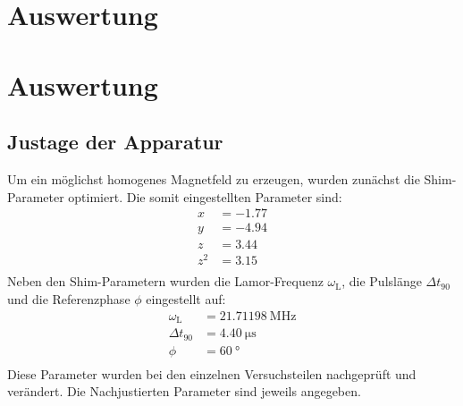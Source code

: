 \section{Auswertung}
\label{sec:Auswertung}

\newpage
\section{Auswertung}
\label{sec:Auswertung}

\subsection{Justage der Apparatur}
Um ein möglichst homogenes Magnetfeld zu erzeugen, wurden zunächst die
Shim-Parameter optimiert. Die somit eingestellten Parameter sind:
\begin{align*}
  x &= \num{-1.77}  \\
  y &= \num{-4.94}  \\
  z &= \num{+3.44}  \\
  z^2 &= \num{+3.15} \\
\end{align*}
Neben den Shim-Parametern wurden die Lamor-Frequenz $\omega_\text{L}$, die
Pulslänge $\Delta t_\text{90}$ und die Referenzphase $\phi$ eingestellt auf:
\begin{align*}
  \omega_\text{L} &= \SI{21.71198}{\mega\hertz} \\
  \Delta t_\text{90} &= \SI{4.40}{\micro\second} \\
  \phi &= \SI{60}{\degree} \\
\end{align*}
Diese Parameter wurden bei den einzelnen Versuchsteilen nachgeprüft und
verändert. Die Nachjustierten Parameter sind jeweils angegeben.


